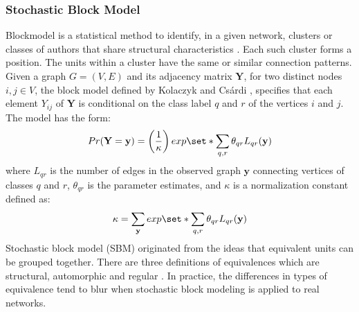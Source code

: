 \subsubsection{Stochastic Block Model}
\label{sec:back_sbm}
Blockmodel is a statistical method to identify, in a given network, clusters or classes of authors that share structural characteristics \cite{lorrain_structural_1971,doreian_generalized_2004}. Each such cluster forms a position. The units within a cluster have the same or similar connection patterns. Given a graph $G=(V,E)$ and its adjacency matrix $\mathbf{Y}$, for two distinct nodes $i,j \in V$, the block model defined by Kolaczyk and Cs\'ardi \cite{kolaczyk_statistical_2014}, specifies that each element $Y_{ij}$ of $\mathbf{Y}$ is conditional on the class label $q$ and $r$ of the vertices $i$ and $j$. The model has the form:
\begin{equation}Pr(\mathbf{Y}=\mathbf{y})=\left( \frac{1}{\kappa} \right) exp \set*{ \sum_{q,r} \theta_{qr} L_{qr}(\mathbf{y}) }\end{equation}
where $L_{qr}$ is the number of edges in the observed graph $\mathbf{y}$ connecting vertices of classes $q$ and $r$, $\theta_{qr}$ is the parameter estimates, and $\kappa$ is a normalization constant defined as:
\begin{equation}
\kappa = \sum_{\mathbf{y}}exp \set*{ \sum_{q,r} \theta_{qr} L_{qr}(\mathbf{y}) }
\end{equation}
Stochastic block model (SBM) originated from the ideas that equivalent units can be grouped together. There are three definitions of equivalences which are structural, automorphic and regular \cite{mali_dynamic_2012}. In practice, the differences in types of equivalence tend to blur when stochastic block modeling is applied to real networks.

